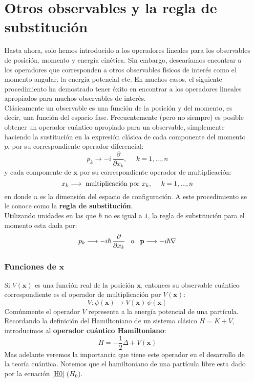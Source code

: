 \documentclass[12pt]{book}
\numberwithin{equation}{chapter}
\def\x{\mathbf{x}}
\def\P{\mathbf{p}}
\begin{document}
\section{Otros observables y la regla de substituci\'on}
Hasta ahora, solo hemos introducido a los operadores lineales para los observables de posici\'on, momento y energ\'ia cin\'etica. Sin embargo, desear\'iamos encontrar a los operadores que corresponden a otros observables f\'isicos de inter\'es como el momento angular, la energ\'ia potencial etc. En muchos casos, el siguiente procedimiento ha demostrado tener \'exito en encontrar a los operadores lineales apropiados para muchos observables de inter\'es.\\

Cl\'asicamente un observable es una funci\'on de la posici\'on y del momento, es decir, una funci\'on del espacio fase. Frecuentemente (pero no siempre) es posible obtener un operador cu\'antico apropiado para un observable, simplemente haciendo la sustituci\'on en la expresi\'on cl\'asica de cada componente del momento $p$, por su correspondiente operador diferencial:
\begin{equation}\label{sus1}
p_{k} \longrightarrow -i\, \frac{\partial}{\partial x_{k}}, \,\,\,\,\,\,\,\, k=1,...,n
\end{equation}
y cada componente de $\x$ por su correspondiente operador de multiplicaci\'on:
\begin{equation}\label{sus2}
x_{k} \longrightarrow \hbox{ multiplicaci\'on por } x_{k}, \,\,\,\,\,\,\,\, k=1,...,n
\end{equation}
en donde $n$ es la dimensi\'on del espacio de configuraci\'on. A este procedimiento se le conoce como la {\bf regla de substituci\'on}.\\ 
Utilizando unidades en las que $\hbar$ no es igual a $1$, la regla de substituci\'on para el momento esta dada por:
\begin{equation}\label{sus3}
p_{k} \longrightarrow -i \hbar \, \frac{\partial}{\partial x_{k}} \,\,\,\,\, \hbox{o} \,\,\,\,\, \P \longrightarrow -i \hbar \nabla
\end{equation}

\subsubsection{Funciones de $\x$}
Si $V(\x)$ es una funci\'on real de la posici\'on $\x$, entonces su observable cu\'antico correspondiente es el operador de multiplicaci\'on por $V(\x)$:
\begin{equation}
V : \psi(\x) \longrightarrow V(\x)\, \psi(\x)
\end{equation}
Com\'unmente el operador $V$ representa a la energ\'ia potencial de una part\'icula. Recordando la definici\'on del Hamiltoniano de un sistema cl\'asico $H=K+V$, introducimos al {\bf operador cu\'antico Hamiltoniano}:
\begin{equation}
H=- \frac{1}{2} \Delta + V(\x)
\end{equation}
Mas adelante veremos la importancia que tiene este operador en el desarrollo de la teor\'ia cu\'antica. Notemos que el hamiltoniano de una part\'icula libre esta dado por la ecuaci\'on \eqref{H0} ($H_{0}$).
\end{document}
